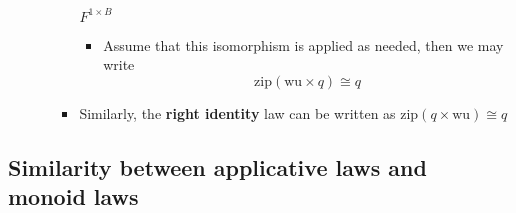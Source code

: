\begin{itemize}
\begin{itemize}
\begin{itemize}
$F^{1\times B}$
\begin{itemize}
\item Assume that this isomorphism is applied as needed, then we may write{\footnotesize{}
\[
\text{zip}\left(\text{wu}\times q\right)\cong q
\]
}{\footnotesize\par}
\end{itemize}
\item Similarly, the \textbf{right identity} law can be written as {\footnotesize{}$\text{zip}\left(q\times\text{wu}\right)\cong q$}{\footnotesize\par}
\end{itemize}
\end{itemize}
\end{itemize}


\subsection{Similarity between applicative laws and monoid laws}
